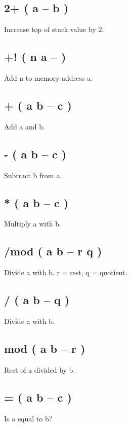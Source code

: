 \subsection{2+ ( a -- b )}

Increase top of stack value by 2.

\subsection{+! ( n a -- )}

Add n to memory address a.

\subsection{+ ( a b -- c )}

Add a and b.

\subsection{- ( a b -- c )}

Subtract b from a.

\subsection{* ( a b -- c )}

Multiply a with b.

\subsection{/mod ( a b -- r q )}

Divide a with b. r = rest, q = quotient.

\subsection{/ ( a b -- q )}

Divide a with b.

\subsection{mod ( a b -- r )}

Rest of a divided by b.

\subsection{= ( a b -- c )}

Is a equal to b?

